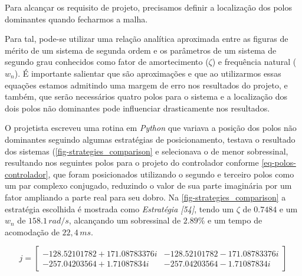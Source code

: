 \documentclass[
	12pt,				%
	article,			%
	openright,			%
	oneside,
	a4paper,			%
	chapter=TITLE,		%
	section=TITLE,		%
	english,			%
	french,				%
	spanish,			%
	brazil,				%
]{abntex2}
\begin{document}
            Para alcançar os requisito de projeto, precisamos definir a localização dos polos dominantes quando fecharmos a malha. 
            
            Para tal, pode-se utilizar uma relação analítica aproximada entre as figuras de mérito de um sistema de segunda ordem e os parâmetros de um sistema de segundo grau conhecidos como fator de amortecimento ($\zeta$) e frequência natural ($w_n$). É importante salientar que são aproximações e que ao utilizarmos essas equações estamos admitindo uma margem de erro nos resultados do projeto, e também, que serão necessários quatro polos para o sistema e a localização dos dois polos não dominantes pode influenciar drasticamente nos resultados.
            
            O projetista escreveu uma rotina em \textit{Python} que variava a posição dos polos não dominantes seguindo algumas estratégias de posicionamento, testava o resultado dos sistemas (\autoref{fig-strategies_comparison} e selecionava o de menor sobressinal, resultando nos seguintes polos para o projeto do controlador conforme \ref{eq-polos-controlador}, que foram posicionados utilizando o segundo e terceiro polos como um par complexo conjugado, reduzindo o valor de sua parte imaginária por um fator ampliando a parte real para seu dobro. Na \autoref{fig-strategies_comparison} a estratégia escolhida é mostrada como \textit{Estratégia [54]}, tendo um $ \zeta $ de $0.7484$ e um $w_n$ de $158.1\,rad/s$, alcançando um sobressinal de $2.89\%$ e um tempo de acomodação de $22,4\,ms$.
            
            \begin{equation}
                \label{eq-polos-controlador}
                j = \begin{bmatrix}
                    -128.52101782 +171.08783376i & -128.52101782 -171.08783376i \\
                    -257.04203564  +1.71087834i & -257.04203564  -1.71087834i
                    \end{bmatrix}
            \end{equation}
            
\end{document}
